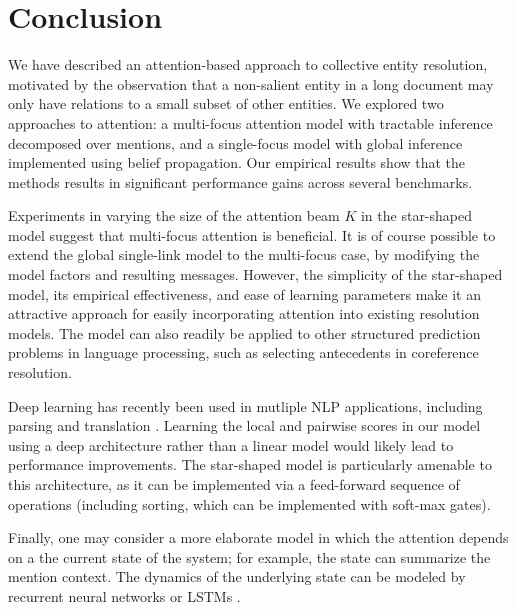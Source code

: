 \section{Conclusion}
\label{sec:End}

We have described an attention-based approach to collective entity resolution,
motivated by the observation that a non-salient entity in a long document may
 only have relations to a small subset of other entities. 
 We explored two approaches to attention: a multi-focus attention model
 with tractable inference decomposed over mentions, and a single-focus
model with global inference implemented using belief propagation.
Our empirical results show that the methods results in significant performance gains
across several benchmarks. 

Experiments in varying the size of the attention beam $K$ in the star-shaped model suggest that
 multi-focus attention is beneficial.
 It is of course possible to extend the global
 single-link model to the multi-focus case, by modifying the model
 factors and resulting messages. 
 However, the simplicity of the star-shaped model, its empirical effectiveness, and ease of learning parameters make it an attractive approach for easily incorporating attention into existing resolution models. The model can also readily be applied 
to other structured prediction problems in language processing, such as
selecting antecedents in coreference resolution.


Deep learning has recently been used in mutliple NLP applications, including parsing \cite{chen2014fast} and translation \cite{bahdanau2014neural}. 
Learning the local and pairwise scores in our model using a deep architecture rather
than a linear model would likely lead to performance improvements.
The star-shaped model is particularly amenable to this architecture, as it can be implemented via
a feed-forward sequence of operations (including sorting, which can be implemented with soft-max gates).

Finally, one may consider a more elaborate model in which the attention
 depends on a the current state of the system; 
 for example, the state can summarize the mention context.
The dynamics of the underlying state can be modeled by
recurrent neural networks or LSTMs \cite{bahdanau2014neural}. 

